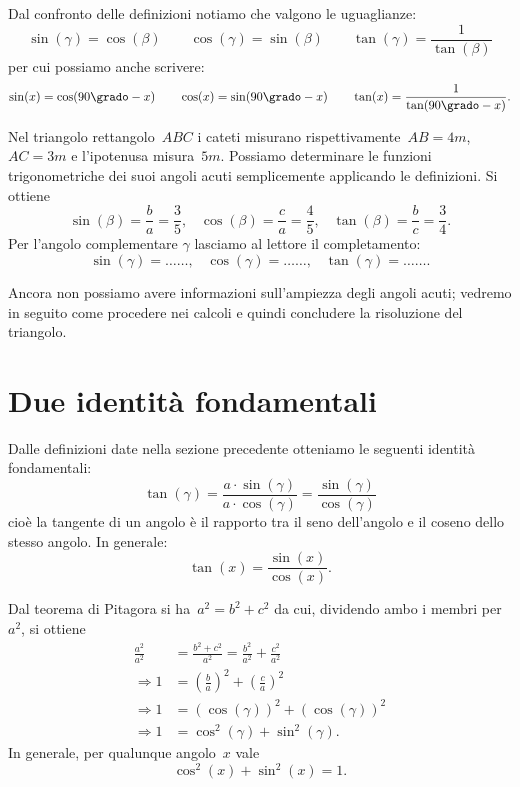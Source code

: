 Dal confronto delle definizioni notiamo che valgono le uguaglianze:
\[\sin(\gamma)=\cos(\beta)\qquad \cos(\gamma)=\sin(\beta)\qquad \tan(\gamma)=\frac{1}{\tan(\beta)}\]
per cui possiamo anche scrivere:
\[\sin(x)=\cos(90\grado-x)\qquad \cos(x)=\sin(90\grado-x)\qquad \tan(x)=\frac{1}{\tan(90\grado-x)}.\]

\begin{exrig}
 \begin{esempio}
Nel triangolo rettangolo~$ABC$ i cateti misurano rispettivamente~$AB=4\unit{m}$, $AC=3\unit{m}$ e l'ipotenusa misura~$5\unit{m}$.
Possiamo determinare le funzioni trigonometriche dei suoi angoli acuti semplicemente applicando le definizioni.
Si ottiene
\[\sin(\beta)=\frac{b}{a}=\frac{3}{5}\text{,}\quad \cos(\beta)=\frac{c}{a}=\frac{4}{5}\text{,}\quad \tan(\beta)=\frac{b}{c}=\frac{3}{4}.\]
Per l'angolo complementare $\gamma$ lasciamo al lettore il completamento:
\[\sin(\gamma)=\ldots\ldots\text{,}\quad \cos(\gamma)=\ldots\ldots\text{,}\quad \tan(\gamma)=\ldots\ldots.\]
 \end{esempio}
\end{exrig}

\osservazione Ancora non possiamo avere informazioni sull'ampiezza degli angoli acuti;
vedremo in seguito come procedere nei calcoli e quindi concludere la risoluzione del triangolo.

\vspace{1.10ex}
\ovalbox{\risolvi \ref{ese:C.1}}

\section{Due identità fondamentali}

Dalle definizioni date nella sezione precedente otteniamo le seguenti identità fondamentali:
\[\tan(\gamma)=\frac{a\cdot \sin(\gamma)}{a\cdot \cos(\gamma)}=\frac{\sin(\gamma)}{\cos(\gamma)}\]
cioè la tangente di un angolo è il rapporto tra il seno dell'angolo e il coseno dello stesso angolo. In generale:
 \begin{equation}
 \label{eq:F.1}
 \tan(x)=\frac{\sin(x)}{\cos(x)}.
 \end{equation}

Dal teorema di Pitagora si ha~$a^{2}=b^{2}+c^{2}$ da cui, dividendo ambo i membri per~$a^{2}$, si ottiene
\begin{align*}
\frac{a^{2}}{a^{2}} &= \frac{b^{2}+c^{2}}{a^{2}}=\frac{b^{2}}{a^{2}}+\frac{c^{2}}{a^{2}}\\
\Rightarrow 1 &= \left(\frac{b}{a}\right)^{2}+\left(\frac{c}{a}\right)^{2}\\
\Rightarrow 1 &= \left(\cos(\gamma)\right)^{2}+\left(\cos (\gamma)\right)^{2}\\
\Rightarrow 1 &= \cos^{2}(\gamma)+\sin^{2}(\gamma).
\end{align*}
In generale, per qualunque angolo~$x$ vale
\begin{equation}
\label{eq:F.2}
 \cos^{2}(x)+\sin^{2}(x)=1.
\end{equation}

